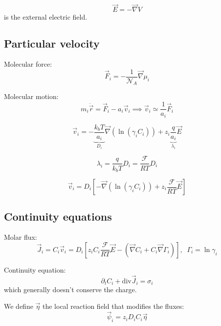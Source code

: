 \documentclass[aps,12pt]{revtex4}
\begin{document}
\begin{equation}
	\vec{E} = -\vec{\nabla} V
\end{equation}
is the external electric field.

\subsection{Particular velocity}
Molecular force:	
\begin{equation}
	\vec{F}_i = - \frac{1}{\mathcal{N}_A} \vec{\nabla} \mu_i
\end{equation}

Molecular motion:
\begin{equation}
	m_i \ddot {\vec{r}} = \vec{F}_i - a_i \vec{v}_i \implies \vec{v}_i \simeq \dfrac{1}{a_i} \vec{F}_i
\end{equation}

\begin{equation}
	\vec{v}_i = -\underbrace{\dfrac{k_bT}{a_i}}_{D_i} \vec{\nabla}(\ln(\gamma_i C_i))  + z_i \underbrace{\dfrac{ q}{a_i}}_{\lambda_i} \vec{E}
\end{equation}

\begin{equation}
	\lambda_i = \frac{q}{k_bT} D_i = \dfrac{\mathcal{F}}{RT} D_i
\end{equation}

\begin{equation}
\boxed{
	\vec{v}_i = D_i \left[ - \vec{\nabla}(\ln(\gamma_i C_i)) + z_i \dfrac{\mathcal{F}}{RT} \vec{E} \right]
}
\end{equation}

\subsection{Continuity equations}

Molar flux:
\begin{equation}
	\vec{J}_i = C_i \vec{v}_i = D_i \left[z_i C_i  \dfrac{\mathcal{F}}{RT} \vec{E} - \left(\vec{\nabla} C_i + C_i \vec{\nabla}\Gamma_i\right) \right],\;\;\Gamma_i = \ln \gamma_i
\end{equation}

Continuity equation:
\begin{equation}
	\partial_t C_i + \mathrm{div} \vec{J}_i = \sigma_i
\end{equation}
which generally doesn't conserve the charge.

We define $\vec \eta$ the local reaction field that modifies the fluxes:
\begin{equation}
	\vec \psi_i = z_i D_i C_i \vec \eta
\end{equation}
\end{document}

